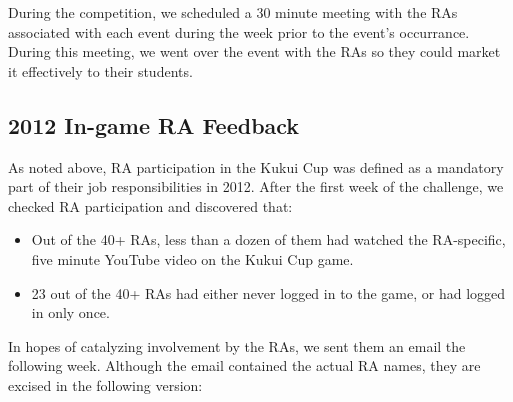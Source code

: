 \documentclass[]{IEEEconf}
\begin{document}
During the competition, we scheduled a 30 minute meeting with the RAs associated with each
event during the week prior to the event's occurrance.  During this meeting, we went over
the event with the RAs so they could market it effectively to their students. 

\subsection{2012 In-game RA Feedback}

As noted above, RA participation in the Kukui Cup was defined as a mandatory part of their job
responsibilities in 2012.  After the first week of the challenge, we checked RA
participation and discovered that:
\begin{itemize}[noitemsep]
\item Out of the 40+ RAs, less than a dozen of them had watched the RA-specific, five
  minute YouTube video on the Kukui Cup game.
\item 23 out of the 40+ RAs had either never logged in to the game, or had logged in only
  once.
\end{itemize}

In hopes of catalyzing involvement by the RAs, we sent them an email the following week.
Although the email contained the actual RA names, they are excised in the following version:
\end{document}
